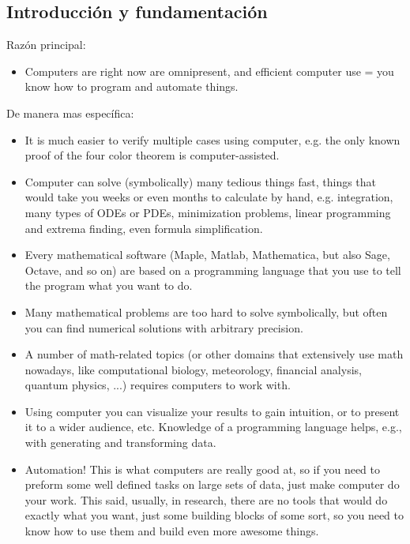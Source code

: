 \documentclass[a4paper,10pt,BCOR10mm,oneside,headsepline]{scrbook}
\begin{document}
 

\subsection{Introducción y fundamentación}

\cite{Seroul:2000,Rose:2015}



Razón principal:


\begin{itemize}
	\item Computers are right now are omnipresent, and efficient computer use = you know how to program and automate things.
\end{itemize}

De manera mas específica:

\begin{itemize}
	\item It is much easier to verify multiple cases using computer, e.g. the only known proof of the four color theorem is computer-assisted.
	
	\item Computer can solve (symbolically) many tedious things fast, things that would take you weeks or even months to calculate by hand, e.g. integration, many types of ODEs or PDEs, minimization problems, linear programming and extrema finding, even formula simplification.
	
	\item Every mathematical software (Maple, Matlab, Mathematica, but also Sage, Octave, and so on) are based on a programming language that you use to tell the program what you want to do.
	
	\item Many mathematical problems are too hard to solve symbolically, but often you can find numerical solutions with arbitrary precision.
	
	\item A number of math-related topics (or other domains that extensively use math nowadays, like computational biology, meteorology, financial analysis, quantum physics, ...) requires computers to work with.
	
	\item Using computer you can visualize your results to gain intuition, or to present it to a wider audience, etc. Knowledge of a programming language helps, e.g., with generating and transforming data.
	
	\item Automation! This is what computers are really good at, so if you need to preform some well defined tasks on large sets of data, just make computer do your work. This said, usually, in research, there are no tools that would do exactly what you want, just some building blocks of some sort, so you need to know how to use them and build even more awesome things.
	

\end{itemize}
\end{document}

